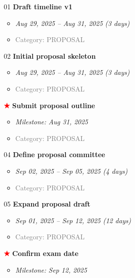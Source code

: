\documentclass[portrait,a4paper]{article}
\begin{document}
\begin{enumerate}[leftmargin=0pt, itemindent=0pt, labelsep=0pt, labelwidth=0pt]
\item[01] \textbf{Draft timeline v1}
    \begin{itemize}
        \item \textit{Aug 29, 2025 -- Aug 31, 2025 (3 days)}
        \item \textcolor{gray}{Category: PROPOSAL}
    \end{itemize}
\vspace{0.3cm}
\item[02] \textbf{Initial proposal skeleton}
    \begin{itemize}
        \item \textit{Aug 29, 2025 -- Aug 31, 2025 (3 days)}
        \item \textcolor{gray}{Category: PROPOSAL}
    \end{itemize}
\vspace{0.3cm}
\item[\textcolor{red}{\textbf{★}}] \textbf{Submit proposal outline}
    \begin{itemize}
        \item \textit{Milestone: Aug 31, 2025}
        \item \textcolor{gray}{Category: PROPOSAL}
    \end{itemize}
\vspace{0.3cm}
\item[04] \textbf{Define proposal committee}
    \begin{itemize}
        \item \textit{Sep 02, 2025 -- Sep 05, 2025 (4 days)}
        \item \textcolor{gray}{Category: PROPOSAL}
    \end{itemize}
\vspace{0.3cm}
\item[05] \textbf{Expand proposal draft}
    \begin{itemize}
        \item \textit{Sep 01, 2025 -- Sep 12, 2025 (12 days)}
        \item \textcolor{gray}{Category: PROPOSAL}
    \end{itemize}
\vspace{0.3cm}
\item[\textcolor{red}{\textbf{★}}] \textbf{Confirm exam date}
    \begin{itemize}
        \item \textit{Milestone: Sep 12, 2025}

\end{itemize}
\end{enumerate}
\end{document}

